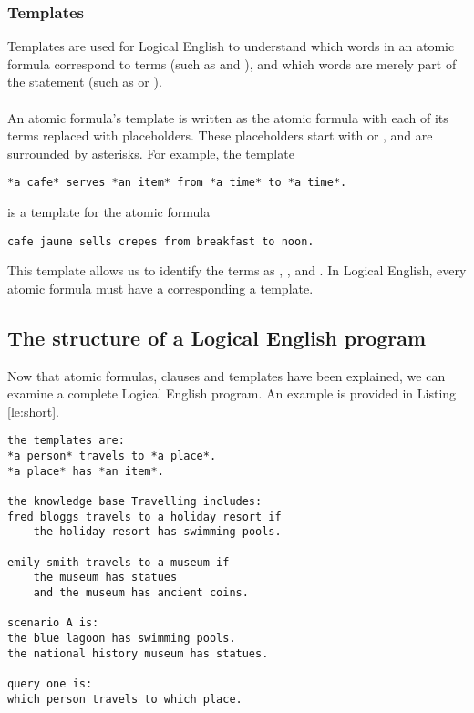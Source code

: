 \documentclass[../main.tex]{subfiles}
\begin{document}
\subsubsection{Templates}
Templates are used for Logical English to understand which words in an atomic formula correspond to terms (such as  and ), and which words are merely part of the statement (such as  or ). 
\\
\\
An atomic formula's template is written as the atomic formula with each of its terms replaced with placeholders. These placeholders start with  or , and are surrounded by asterisks. For example, the template
\begin{lstlisting}[language={LE},caption={A template in Logical English},label={le:template}]
    *a cafe* serves *an item* from *a time* to *a time*.
\end{lstlisting}
is a template for the atomic formula
\begin{lstlisting}[language={LE}]
    cafe jaune sells crepes from breakfast to noon.
\end{lstlisting}
This template allows us to identify the terms as , ,  and . In Logical English, every atomic formula must have a corresponding a template.

\subsection{The structure of a Logical English program}
Now that atomic formulas, clauses and templates have been explained, we can examine a complete Logical English program. An example is provided in Listing \ref{le:short}.

\newpage
\begin{lstlisting}[language={LE},caption={A short Logical English program.},label={le:short}]
the templates are:
*a person* travels to *a place*.
*a place* has *an item*.

the knowledge base Travelling includes:
fred bloggs travels to a holiday resort if 
    the holiday resort has swimming pools.

emily smith travels to a museum if
    the museum has statues 
    and the museum has ancient coins.

scenario A is:
the blue lagoon has swimming pools.
the national history museum has statues.

query one is:
which person travels to which place.
\end{lstlisting}
\end{document}
